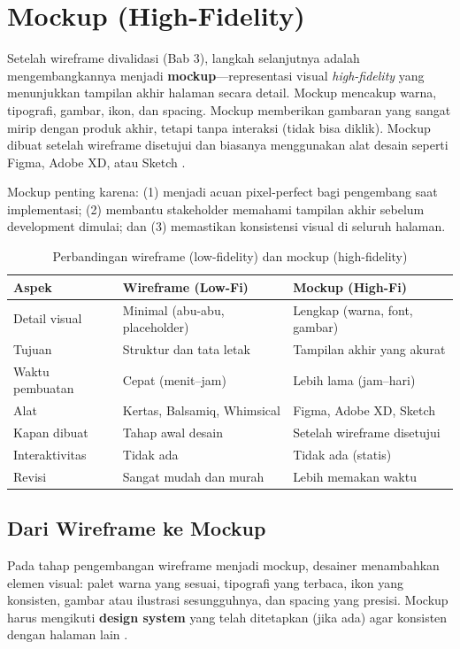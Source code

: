 ﻿\section{Mockup (High-Fidelity)}

Setelah wireframe divalidasi (Bab 3), langkah selanjutnya adalah mengembangkannya menjadi \textbf{mockup}---representasi visual \textit{high-fidelity} yang menunjukkan tampilan akhir halaman secara detail. Mockup mencakup warna, tipografi, gambar, ikon, dan spacing. Mockup memberikan gambaran yang sangat mirip dengan produk akhir, tetapi tanpa interaksi (tidak bisa diklik). Mockup dibuat setelah wireframe disetujui dan biasanya menggunakan alat desain seperti Figma, Adobe XD, atau Sketch \cite{figmaDocs}.

Mockup penting karena: (1) menjadi acuan pixel-perfect bagi pengembang saat implementasi; (2) membantu stakeholder memahami tampilan akhir sebelum development dimulai; dan (3) memastikan konsistensi visual di seluruh halaman.

\begin{table}[H]
\centering
\begin{tabular}{|P{3cm}|P{4.5cm}|P{4.5cm}|}
\hline
\textbf{Aspek} & \textbf{Wireframe (Low-Fi)} & \textbf{Mockup (High-Fi)} \\
\hline
Detail visual & Minimal (abu-abu, placeholder) & Lengkap (warna, font, gambar) \\
\hline
Tujuan & Struktur dan tata letak & Tampilan akhir yang akurat \\
\hline
Waktu pembuatan & Cepat (menit--jam) & Lebih lama (jam--hari) \\
\hline
Alat & Kertas, Balsamiq, Whimsical & Figma, Adobe XD, Sketch \\
\hline
Kapan dibuat & Tahap awal desain & Setelah wireframe disetujui \\
\hline
Interaktivitas & Tidak ada & Tidak ada (statis) \\
\hline
Revisi & Sangat mudah dan murah & Lebih memakan waktu \\
\hline
\end{tabular}
\caption{Perbandingan wireframe (low-fidelity) dan mockup (high-fidelity)}
\end{table}

\subsection{Dari Wireframe ke Mockup}

Pada tahap pengembangan wireframe menjadi mockup, desainer menambahkan elemen visual: palet warna yang sesuai, tipografi yang terbaca, ikon yang konsisten, gambar atau ilustrasi sesungguhnya, dan spacing yang presisi. Mockup harus mengikuti \textbf{design system} yang telah ditetapkan (jika ada) agar konsisten dengan halaman lain \cite{figmaDocs}.

